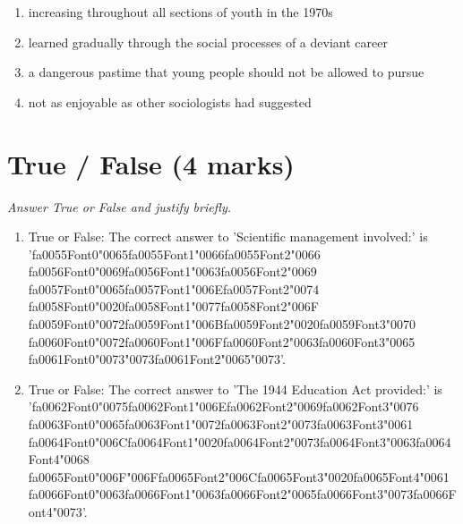\documentclass[12pt]{article}
\begin{document}
\begin{enumerate}[label=\arabic*.]
\begin{enumerate}[label=(\alph*)]
    \item increasing throughout all sections of youth in the 1970s
    \item learned gradually through the social processes of a deviant career
    \item a dangerous pastime that young people should not be allowed to pursue
    \item not as enjoyable as other sociologists had suggested
\end{enumerate}
\end{enumerate}

\section*{True / False (4 marks)}
\textit{Answer True or False and justify briefly.}
\begin{enumerate}[label=\arabic*.]
\item True or False: The correct answer to 'Scientific management involved:' is '{\csname fa0055Font0\endcsname\char"0065}{\csname fa0055Font1\endcsname\char"0066}{\csname fa0055Font2\endcsname\char"0066} {\csname fa0056Font0\endcsname\char"0069}{\csname fa0056Font1\endcsname\char"0063}{\csname fa0056Font2\endcsname\char"0069} {\csname fa0057Font0\endcsname\char"0065}{\csname fa0057Font1\endcsname\char"006E}{\csname fa0057Font2\endcsname\char"0074} {\csname fa0058Font0\endcsname\char"0020}{\csname fa0058Font1\endcsname\char"0077}{\csname fa0058Font2\endcsname\char"006F} {\csname fa0059Font0\endcsname\char"0072}{\csname fa0059Font1\endcsname\char"006B}{\csname fa0059Font2\endcsname\char"0020}{\csname fa0059Font3\endcsname\char"0070} {\csname fa0060Font0\endcsname\char"0072}{\csname fa0060Font1\endcsname\char"006F}{\csname fa0060Font2\endcsname\char"0063}{\csname fa0060Font3\endcsname\char"0065} {\csname fa0061Font0\endcsname\char"0073}{\char"0073}{\csname fa0061Font2\endcsname\char"0065}{\char"0073}'.
\item True or False: The correct answer to 'The 1944 Education Act provided:' is '{\csname fa0062Font0\endcsname\char"0075}{\csname fa0062Font1\endcsname\char"006E}{\csname fa0062Font2\endcsname\char"0069}{\csname fa0062Font3\endcsname\char"0076} {\csname fa0063Font0\endcsname\char"0065}{\csname fa0063Font1\endcsname\char"0072}{\csname fa0063Font2\endcsname\char"0073}{\csname fa0063Font3\endcsname\char"0061} {\csname fa0064Font0\endcsname\char"006C}{\csname fa0064Font1\endcsname\char"0020}{\csname fa0064Font2\endcsname\char"0073}{\csname fa0064Font3\endcsname\char"0063}{\csname fa0064Font4\endcsname\char"0068} {\csname fa0065Font0\endcsname\char"006F}{\char"006F}{\csname fa0065Font2\endcsname\char"006C}{\csname fa0065Font3\endcsname\char"0020}{\csname fa0065Font4\endcsname\char"0061} {\csname fa0066Font0\endcsname\char"0063}{\csname fa0066Font1\endcsname\char"0063}{\csname fa0066Font2\endcsname\char"0065}{\csname fa0066Font3\endcsname\char"0073}{\csname fa0066Font4\endcsname\char"0073}'.
\end{enumerate}
\end{document}
